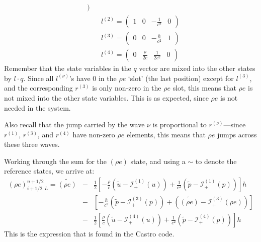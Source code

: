\documentclass[11pt]{article}
\begin{document}
\begin{itemize}
\begin{eqnarray}
\begin{array}{cccc}
            \end{array} ) \nonumber \\
&&
l^{(2)} = ( \begin{array}{cccc} 1 & 0 & -\frac{1}{c^2} & 0 
            \end{array} ) \nonumber \\
&&
l^{(3)} = ( \begin{array}{cccc} 0 & 0 & -\frac{h}{c^2} & 1 
            \end{array} ) \nonumber \\
&&
l^{(4)} = ( \begin{array}{cccc} 0 & \frac{\rho}{2c} & \frac{1}{2c^2} & 0 
            \end{array} )
\end{eqnarray}
Remember that the state variables in the $q$ vector are mixed into the
other states by $l \cdot q$.  Since all $l^{(\nu)}$'s have $0$ in the
$\rho e$ `slot' (the last position) except for $l^{(3)}$, and the
corresponding $r^{(3)}$ is only non-zero in the $\rho e$ slot, this
means that $\rho e$ is not mixed into the other state variables.  This
is as expected, since $\rho e$ is not needed in the system.

Also recall that the jump carried by the wave $\nu$ is proportional
to $r^{(\nu)}$---since $r^{(1)}$, $r^{(3)}$, and $r^{(4)}$ have
non-zero $\rho e$ elements, this means that $\rho e$ jumps across 
these three waves.

Working through the sum for the $(\rho e)$ state, and using a $\sim$ to
denote the reference states, we arrive at:
\begin{eqnarray}
(\rho e)_{i+1/2,L}^{n+1/2} = \widetilde{(\rho e)} &-&
   \frac{1}{2} \left [ -\frac{\rho}{c} \left (\tilde{u} - \mathcal{I}^{(1)}_+(u) \right )
                       +\frac{1}{c^2} \left (\tilde{p} - \mathcal{I}^{(1)}_+(p) \right )
               \right ] h \nonumber \\
  &-&
    \left [ -\frac{h}{c^2} \left (\tilde{p} - \mathcal{I}^{(3)}_+(p) \right )
                       + \left (\widetilde{(\rho e)} - \mathcal{I}^{(3)}_+(\rho e) \right )
               \right ] \nonumber \\
  &-&
   \frac{1}{2} \left [ \frac{\rho}{c} \left (\tilde{u} - \mathcal{I}^{(4)}_+(u) \right )
                       +\frac{1}{c^2} \left (\tilde{p} - \mathcal{I}^{(4)}_+(p) \right )
               \right ] h 
\end{eqnarray}
This is the expression that is found in the Castro code.



\end{itemize}
\end{document}
